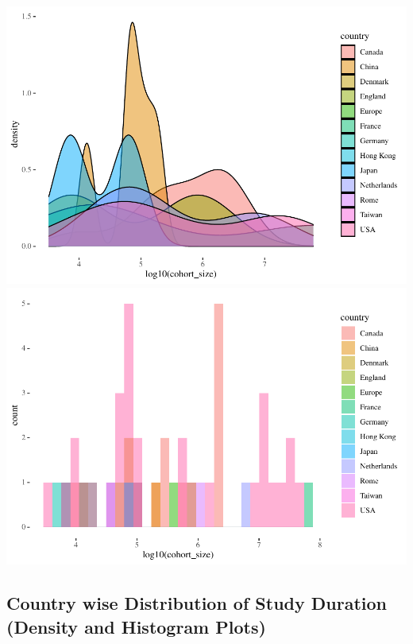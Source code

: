 \documentclass[
]{article}
\begin{document}
\includegraphics[width=1\linewidth]{man/figures/README-plot5_cohort_size_dist_country_wise-1}
\includegraphics[width=1\linewidth]{man/figures/README-plot5_cohort_size_dist_country_wise-2}

\hypertarget{country-wise-distribution-of-study-duration-density-and-histogram-plots}{%
\subsection{Country wise Distribution of Study Duration (Density and
Histogram
Plots)}\label{country-wise-distribution-of-study-duration-density-and-histogram-plots}}
\end{document}
